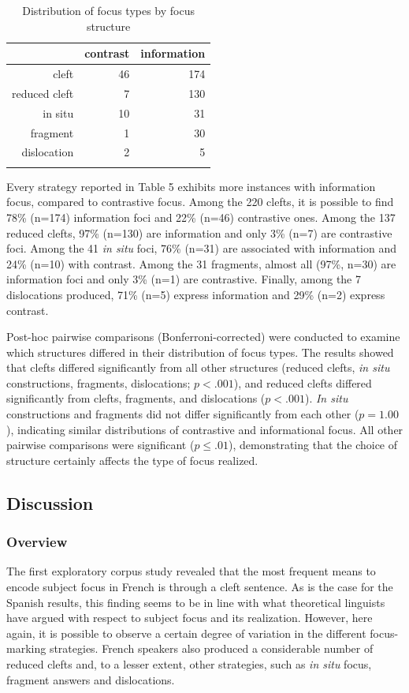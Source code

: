\begin{table}[ht]
\centering
\begin{tabular}{rrr}
  \lsptoprule
 & contrast & information \\ 
  \midrule
cleft &  46 & 174 \\ 
  reduced cleft &   7 & 130 \\ 
  in situ &  10 &  31 \\ 
  fragment &   1 &  30 \\ 
  dislocation &   2 &   5 \\ 
   \lspbottomrule
\end{tabular}
\caption{Distribution of focus types by focus structure}
\end{table}


Every strategy reported in Table 5 exhibits more instances with information focus, compared to contrastive focus. Among the 220 clefts, it is possible to find 78\% (n=174) information foci and 22\% (n=46) contrastive ones. Among the 137 reduced clefts, 97\% (n=130) are information and only 3\% (n=7) are contrastive foci. Among the 41 \textit{in situ} foci, 76\% (n=31) are associated with information and 24\% (n=10) with contrast. Among the 31 fragments, almost all (97\%, n=30) are information foci and only 3\% (n=1) are contrastive. Finally, among the 7 dislocations produced, 71\% (n=5) express information and 29\% (n=2) express contrast. 

Post-hoc pairwise comparisons (Bonferroni-corrected) were conducted to examine which structures differed in their distribution of focus types. The results showed that clefts differed significantly from all other structures (reduced clefts, \textit{in situ} constructions, fragments, dislocations; $p < .001$), and reduced clefts differed significantly from clefts, fragments, and dislocations ($p < .001$). \textit{In situ} constructions and fragments did not differ significantly from each other ($p = 1.00$), indicating similar distributions of contrastive and informational focus. All other pairwise comparisons were significant ($p \leq .01$), demonstrating that the choice of structure certainly affects the type of focus realized.


\subsection{Discussion}
\subsubsection{Overview}
The first exploratory corpus study revealed that the most frequent means to encode subject focus in French is through a cleft sentence. As is the case for the Spanish results, this finding seems to be in line with what theoretical linguists have argued with respect to subject focus and its realization. However, here again, it is possible to observe a certain degree of variation in the different focus-marking strategies. French speakers also produced a considerable number of reduced clefts and, to a lesser extent, other strategies, such as \textit{in situ} focus, fragment answers and dislocations.

